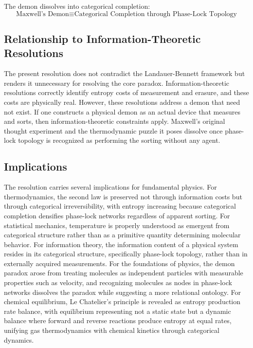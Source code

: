 \documentclass[12pt,a4paper]{article}
\theoremstyle{definition}
\theoremstyle{remark}
\begin{document}
The demon dissolves into categorical completion:
\begin{equation}
\boxed{\text{Maxwell's Demon} \equiv \text{Categorical Completion through Phase-Lock Topology}}
\end{equation}

\subsection{Relationship to Information-Theoretic Resolutions}

The present resolution does not contradict the Landauer-Bennett framework but renders it unnecessary for resolving the core paradox. Information-theoretic resolutions correctly identify entropy costs of measurement and erasure, and these costs are physically real. However, these resolutions address a demon that need not exist. If one constructs a physical demon as an actual device that measures and sorts, then information-theoretic constraints apply. Maxwell's original thought experiment and the thermodynamic puzzle it poses dissolve once phase-lock topology is recognized as performing the sorting without any agent.

\subsection{Implications}

The resolution carries several implications for fundamental physics. For thermodynamics, the second law is preserved not through information costs but through categorical irreversibility, with entropy increasing because categorical completion densifies phase-lock networks regardless of apparent sorting. For statistical mechanics, temperature is properly understood as emergent from categorical structure rather than as a primitive quantity determining molecular behavior. For information theory, the information content of a physical system resides in its categorical structure, specifically phase-lock topology, rather than in externally acquired measurements. For the foundations of physics, the demon paradox arose from treating molecules as independent particles with measurable properties such as velocity, and recognizing molecules as nodes in phase-lock networks dissolves the paradox while suggesting a more relational ontology. For chemical equilibrium, Le Chatelier's principle is revealed as entropy production rate balance, with equilibrium representing not a static state but a dynamic balance where forward and reverse reactions produce entropy at equal rates, unifying gas thermodynamics with chemical kinetics through categorical dynamics.
\end{document}

